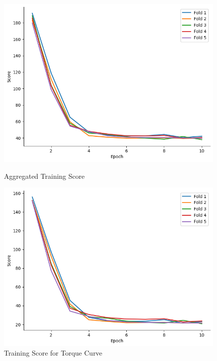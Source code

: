 \documentclass{report} %
\begin{document}
\begin{figure}[H]
    \centering
    \begin{minipage}[b]{0.3\textwidth}
        \includegraphics[width=\textwidth]{./ReportImages/train_score.png}
        \caption{Aggregated Training Score}
        \label{fig:Aggregated Training Score}
    \end{minipage}
    \hfill
    \begin{minipage}[b]{0.3\textwidth}
        \includegraphics[width=\textwidth]{./ReportImages/train_score_y1.png}
        \caption{Training Score for Torque Curve}
        \label{fig:Training Score for Torque Curve}
    \end{minipage}
    \hfill
    \begin{minipage}[b]{0.3\textwidth}

\end{minipage}
\end{figure}
\end{document}
